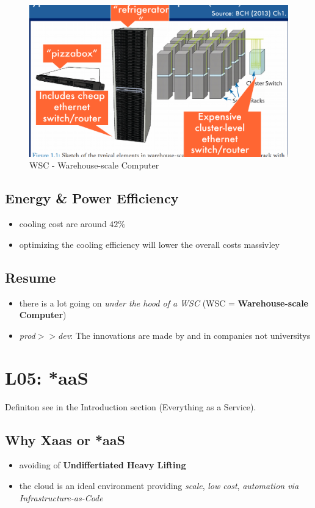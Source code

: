 \documentclass[a4paper]{article}
\begin{document}
\begin{multicols}{3}
\begin{figure}[H]
    \includegraphics[width=\linewidth]{warehousescalecomputer.png}
    \caption{WSC - Warehouse-scale Computer}
    \label{fig:warehousescalecomputer}
\end{figure}

\subsection{Energy \& Power Efficiency}
\begin{itemize}
    \item cooling cost are around $42\%$
    \item optimizing the cooling efficiency will lower the overall costs massivley
\end{itemize}

\subsection{Resume}
\begin{itemize}
    \item there is a lot going on \textit{under the hood of a WSC} (WSC = \textbf{Warehouse-scale Computer})
    \item \textit{prod$>>$dev}: The innovations are made by and in companies not universitys
\end{itemize}

\section{L05: *aaS}
Definiton see in the Introduction section (Everything as a Service).%

\subsection{Why Xaas or *aaS}
\begin{itemize}
    \item avoiding of \textbf{Undiffertiated Heavy Lifting}
    \item the cloud is an ideal environment providing \textit{scale}, \textit{low cost}, \textit{automation via Infrastructure-as-Code}
\end{itemize}


\end{multicols}
\end{document}
